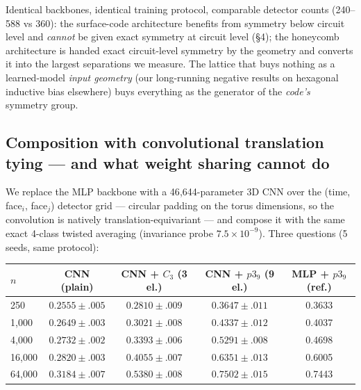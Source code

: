 \documentclass[11pt]{article}
\begin{document}
Identical backbones, identical training protocol, comparable detector
counts (240--588 vs 360): the surface-code architecture benefits from
symmetry below circuit level and \emph{cannot} be given exact symmetry at
circuit level (\S4); the honeycomb architecture is handed exact
circuit-level symmetry by the geometry and converts it into the largest
separations we measure. The lattice that buys nothing as a learned-model
\emph{input geometry} (our long-running negative results on hexagonal
inductive bias elsewhere) buys everything as the generator of the
\emph{code's} symmetry group.

\subsection{Composition with convolutional translation tying --- and what
weight sharing cannot do}
\label{sec:cnn}

We replace the MLP backbone with a 46{,}644-parameter 3D CNN over the
(time, face$_i$, face$_j$) detector grid --- circular padding on the torus
dimensions, so the convolution is natively translation-equivariant --- and
compose it with the same exact 4-class twisted averaging (invariance probe
$7.5 \times 10^{-9}$). Three questions (5 seeds, same protocol):

\begin{center}
\begin{tabular}{lcccc}
\toprule
$n$ & CNN (plain) & CNN + $C_3$ (3 el.) & CNN + $p3_9$ (9 el.) &
MLP + $p3_9$ (ref.) \\
\midrule
250 & $0.2555 \pm .005$ & $0.2810 \pm .009$ & $\mathbf{0.3647 \pm .011}$ & 0.3633 \\
1{,}000 & $0.2649 \pm .003$ & $0.3021 \pm .008$ & $\mathbf{0.4337 \pm .012}$ & 0.4037 \\
4{,}000 & $0.2732 \pm .002$ & $0.3393 \pm .006$ & $\mathbf{0.5291 \pm .008}$ & 0.4698 \\
16{,}000 & $0.2820 \pm .003$ & $0.4055 \pm .007$ & $\mathbf{0.6351 \pm .013}$ & 0.6005 \\
64{,}000 & $0.3184 \pm .007$ & $0.5380 \pm .008$ & $\mathbf{0.7502 \pm .015}$ & 0.7443 \\
\bottomrule
\end{tabular}
\end{center}
\end{document}
